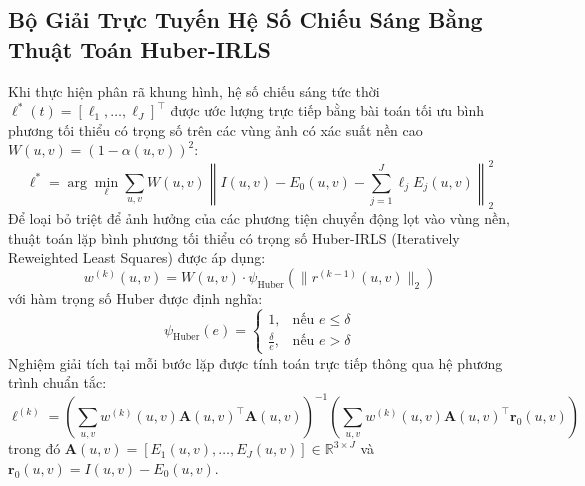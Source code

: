\documentclass[11pt,a4paper]{article}
\begin{document}
\subsection{Bộ Giải Trực Tuyến Hệ Số Chiếu Sáng Bằng Thuật Toán Huber-IRLS}
Khi thực hiện phân rã khung hình, hệ số chiếu sáng tức thời $\bm{\ell}^*(t) = [\ell_1, \dots, \ell_J]^\top$ được ước lượng trực tiếp bằng bài toán tối ưu bình phương tối thiểu có trọng số trên các vùng ảnh có xác suất nền cao $W(u, v) = (1 - \alpha(u, v))^2$:
\begin{equation}
    \bm{\ell}^* = \arg\min_{\bm{\ell}} \sum_{u, v} W(u, v) \left\| I(u, v) - E_0(u, v) - \sum_{j=1}^J \ell_j E_j(u, v) \right\|_2^2
\end{equation}
Để loại bỏ triệt để ảnh hưởng của các phương tiện chuyển động lọt vào vùng nền, thuật toán lặp bình phương tối thiểu có trọng số Huber-IRLS (Iteratively Reweighted Least Squares) được áp dụng:
\begin{equation}
    w^{(k)}(u, v) = W(u, v) \cdot \psi_{\text{Huber}}\left( \|r^{(k-1)}(u, v)\|_2 \right)
\end{equation}
với hàm trọng số Huber được định nghĩa:
\begin{equation}
    \psi_{\text{Huber}}(e) = \begin{cases} 1, & \text{nếu } e \le \delta \\ \frac{\delta}{e}, & \text{nếu } e > \delta \end{cases}
\end{equation}
Nghiệm giải tích tại mỗi bước lặp được tính toán trực tiếp thông qua hệ phương trình chuẩn tắc:
\begin{equation}
    \bm{\ell}^{(k)} = \left( \sum_{u, v} w^{(k)}(u, v) \mathbf{A}(u, v)^\top \mathbf{A}(u, v) \right)^{-1} \left( \sum_{u, v} w^{(k)}(u, v) \mathbf{A}(u, v)^\top \mathbf{r}_0(u, v) \right)
\end{equation}
trong đó $\mathbf{A}(u, v) = [E_1(u, v), \dots, E_J(u, v)] \in \mathbb{R}^{3 \times J}$ và $\mathbf{r}_0(u, v) = I(u, v) - E_0(u, v)$.
\end{document}
